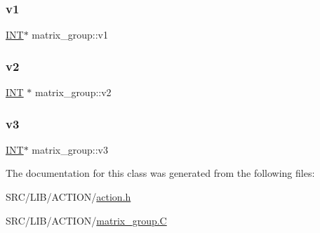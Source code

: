 \subsubsection{\texorpdfstring{v1}{v1}}
{\footnotesize\ttfamily \mbox{\hyperlink{galois_8h_a09fddde158a3a20bd2dcadb609de11dc}{I\+NT}}$\ast$ matrix\+\_\+group\+::v1}

\mbox{\label{classmatrix__group_a9f2bb6e87803452f172dbf86e2ac262d}} 
\subsubsection{\texorpdfstring{v2}{v2}}
{\footnotesize\ttfamily \mbox{\hyperlink{galois_8h_a09fddde158a3a20bd2dcadb609de11dc}{I\+NT}} $\ast$ matrix\+\_\+group\+::v2}

\mbox{\label{classmatrix__group_ab38d936ea3f79e0ec0cb1ab967227bf0}} 
\subsubsection{\texorpdfstring{v3}{v3}}
{\footnotesize\ttfamily \mbox{\hyperlink{galois_8h_a09fddde158a3a20bd2dcadb609de11dc}{I\+NT}}$\ast$ matrix\+\_\+group\+::v3}



The documentation for this class was generated from the following files\+:\begin{DoxyCompactItemize}
\item 
S\+R\+C/\+L\+I\+B/\+A\+C\+T\+I\+O\+N/\mbox{\hyperlink{action_8h}{action.\+h}}\item 
S\+R\+C/\+L\+I\+B/\+A\+C\+T\+I\+O\+N/\mbox{\hyperlink{matrix__group_8_c}{matrix\+\_\+group.\+C}}\end{DoxyCompactItemize}
